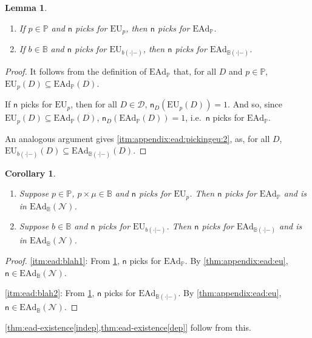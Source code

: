 \documentclass[a4paper]{article}
\newtheorem{lemma}[theorem]{Lemma}
\newtheorem{corollary}[theorem]{Corollary}
\renewcommand\P{\mathbb{P}} %
\newcommand\EU{\mathrm{EU}}
\newcommand\EAd{\mathrm{EAd}}
\newcommand{\Decs}{\mathcal{D}}
\newcommand{\n}{\mathsf{n}}
\renewcommand{\nu}{\n}
\newcommand\Nu{\mathcal{N}}
\newcommand{\IB}{\mathbb{B}}
\newcommand{\IP}{\P}
\newenvironment{CCM rewritten}
{\begingroup\color{blue}} %
{\endgroup}              %
\begin{document}
\begin{lemma}\label{thm:appendix:ead:pickingeu}\ 
	\begin{enumerate}[label=\normalfont(\roman*), ref=(\roman*)]
		\item\label{itm:appendix:ead:pickingeu:1} If $p\in \IP$ and $\nu$ picks for $\EU_p$, then $\nu$ picks for $\EAd_\IP$.
		\item\label{itm:appendix:ead:pickingeu:2}  If $b\in\IB$ and $\nu$ picks for $\EU_{b(\cdot|-)}$, then $\nu$ picks for $\EAd_{\IB(\cdot|-)}$. 
	\end{enumerate}
\end{lemma}
\begin{proof}
	It follows from the definition of $\EAd_\IP$ that, for all $D$ and $p \in \IP$, $\EU_p(D)\subseteq \EAd_\IP(D)$.
	
	If $\nu$ picks for $\EU_p$, then for all $D\in\Decs$, $\nu_D(\EU_p(D))=1$. And so, since  $\EU_p(D)\subseteq \EAd_\IP(D)$, $\nu_D(\EAd_\IP(D))=1$, i.e.~$\nu$ picks for $\EAd_\IP$. 
	
	An analogous argument gives \ref{itm:appendix:ead:pickingeu:2}, as,  for all $D$, $\EU_{b(\cdot|-)}(D)\subseteq\EAd_{\IB(\cdot|-)}(D)$. 
\end{proof}

\begin{corollary}\label{thm:appendix:ead:exists}\ 
	\begin{enumerate}[label=\normalfont(\roman*), ref=(\roman*)]
		\item \label{itm:ead:blah1}Suppose $p\in\IP$,  $p\times\mu\in\IB$ and $\nu$ picks for $\EU_p$. Then $\nu$ picks for $\EAd_\IP$ and is in $\EAd_\IB(\Nu)$. 
		\item \label{itm:ead:blah2}Suppose $b\in\IB$ and $\nu$ picks for $\EU_{b(\cdot|-)}$. Then $\nu$ picks for $\EAd_{\IB(\cdot|-)}$ and is in $\EAd_\IB(\Nu)$. 
	\end{enumerate}
\end{corollary}
\begin{proof}
	\ref{itm:ead:blah1}: From \cref{thm:appendix:ead:pickingeu}, $\nu$ picks for $\EAd_\IP$. By \cref{thm:appendix:ead:eu}, $\nu\in\EAd_\IB(\Nu)$. 
	
	\ref{itm:ead:blah2}: From \cref{thm:appendix:ead:pickingeu}, $\nu$ picks for $\EAd_{\IB(\cdot|-)}$. By \cref{thm:appendix:ead:eu}, $\nu\in\EAd_\IB(\Nu)$. 
\end{proof}
\cref{thm:ead-existence[indep],thm:ead-existence[dep]} follow from this.
\end{document}
